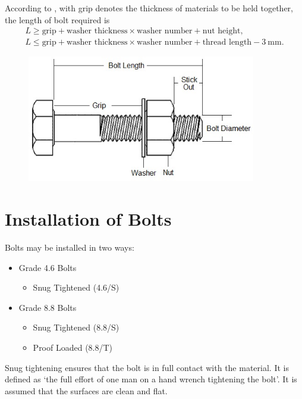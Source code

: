 According to \NZSSTEEL{~}, with grip denotes the thickness of materials to be held together, the length of bolt required is
\begin{gather*}
L\geqslant\text{grip}+\text{washer thickness}\times\text{washer number}+\text{nut height},\\
L\leqslant\text{grip}+\text{washer thickness}\times\text{washer number}+\text{thread length}-\SI{3}{\mm}.
\end{gather*}
\begin{figure}[H]
\centering\includegraphics[width=10cm]{PIC/CH06/GRIP}
\end{figure}
\section{Installation of Bolts}
Bolts may be installed in two ways:
\begin{itemize}
\item Grade 4.6 Bolts
\begin{itemize}
\item Snug Tightened (4.6/S)
\end{itemize}
\item Grade 8.8 Bolts
\begin{itemize}
\item Snug Tightened (8.8/S)
\item Proof Loaded (8.8/T)
\end{itemize}
\end{itemize}

Snug tightening ensures that the bolt is in full contact with the material. It is defined as `the full effort of one man on a hand wrench tightening the bolt'. It is assumed that the surfaces are clean and flat.

